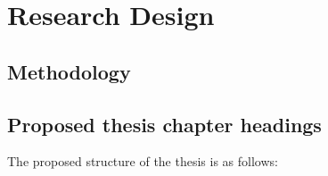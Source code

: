 \documentclass[a4paper,11pt]{article}
\begin{document}
\section{Research Design} %
\label{sec:research_design}

\subsection{Methodology} %
\label{sub:methodology}




\subsection{Proposed thesis chapter headings} %
\label{sub:proposed_thesis_chapter_headings}

The proposed structure of the thesis is as follows:
\end{document}
